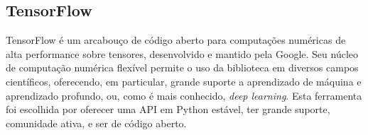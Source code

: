 
\subsection{TensorFlow}
\label{sec:tensorflow}

TensorFlow é um arcabouço de código aberto para computações numéricas de alta performance sobre tensores, desenvolvido e mantido pela Google.
Seu núcleo de computação numérica flexível permite o uso da biblioteca em diversos campos científicos, oferecendo, em particular, grande suporte a aprendizado de máquina e aprendizado profundo, ou, como é mais conhecido, \textit{deep learning}.
Esta ferramenta foi escolhida por oferecer uma API em Python estável, ter grande suporte, comunidade ativa, e ser de código aberto.


%

